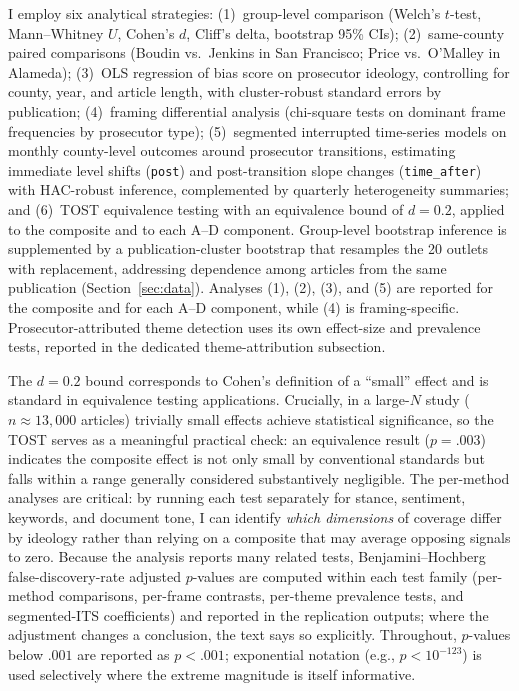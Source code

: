 \documentclass[12pt, letterpaper]{article}
\begin{document}
I employ six analytical strategies: (1)~group-level comparison (Welch's $t$-test, Mann--Whitney $U$, Cohen's $d$, Cliff's delta, bootstrap 95\% CIs); (2)~same-county paired comparisons (Boudin vs.\ Jenkins in San Francisco; Price vs.\ O'Malley in Alameda); (3)~OLS regression of bias score on prosecutor ideology, controlling for county, year, and article length, with cluster-robust standard errors by publication; (4)~framing differential analysis (chi-square tests on dominant frame frequencies by prosecutor type); (5)~segmented interrupted time-series models on monthly county-level outcomes around prosecutor transitions, estimating immediate level shifts (\texttt{post}) and post-transition slope changes (\texttt{time\_after}) with HAC-robust inference, complemented by quarterly heterogeneity summaries; and (6)~TOST equivalence testing \citep{lakens2017} with an equivalence bound of $d = 0.2$, applied to the composite and to each A--D component. Group-level bootstrap inference is supplemented by a publication-cluster bootstrap that resamples the 20 outlets with replacement, addressing dependence among articles from the same publication (Section~\ref{sec:data}). Analyses (1), (2), (3), and (5) are reported for the composite and for each A--D component, while (4) is framing-specific. Prosecutor-attributed theme detection uses its own effect-size and prevalence tests, reported in the dedicated theme-attribution subsection.

The $d = 0.2$ bound corresponds to Cohen's definition of a ``small'' effect and is standard in equivalence testing applications. Crucially, in a large-$N$ study ($n \approx 13{,}000$ articles) trivially small effects achieve statistical significance, so the TOST serves as a meaningful practical check: an equivalence result ($p = .003$) indicates the composite effect is not only small by conventional standards but falls within a range generally considered substantively negligible. The per-method analyses are critical: by running each test separately for stance, sentiment, keywords, and document tone, I can identify \emph{which dimensions} of coverage differ by ideology rather than relying on a composite that may average opposing signals to zero. Because the analysis reports many related tests, Benjamini--Hochberg false-discovery-rate adjusted $p$-values are computed within each test family (per-method comparisons, per-frame contrasts, per-theme prevalence tests, and segmented-ITS coefficients) and reported in the replication outputs; where the adjustment changes a conclusion, the text says so explicitly. Throughout, $p$-values below $.001$ are reported as $p < .001$; exponential notation (e.g., $p < 10^{-123}$) is used selectively where the extreme magnitude is itself informative.
\end{document}

